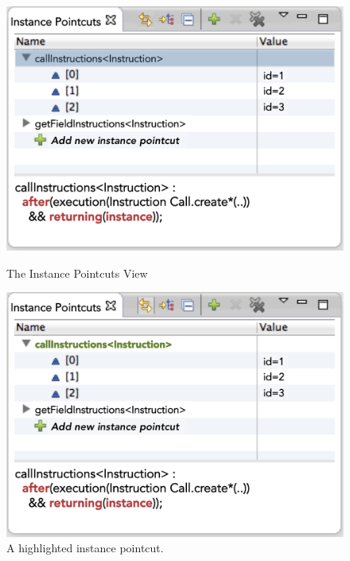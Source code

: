 \begin{figure}[t!]
\begin{minipage}[t]{0.3333\textwidth}
\centering
\includegraphics[scale=0.24]{images/callInstructions.png}
\caption{The Instance Pointcuts View}
\label{fig:ip-view}
\end{minipage}
\begin{minipage}[t]{0.3333\textwidth}
\centering
\includegraphics[scale=0.24]{images/callInstructionsHighlighted.png}
\caption{A highlighted instance pointcut.}
\label{fig:ip-view-highlight}
\end{minipage}
\begin{minipage}[t]{0.3333\textwidth}
\centering

\end{minipage}
\end{figure}
